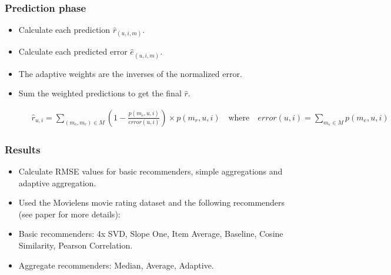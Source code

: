 \documentclass[screen]{beamer}
\begin{document}
\begin{frame}
  \frametitle{Prediction phase}
  
  \begin{itemize}
    \item Calculate each prediction $\hat{r}_{(u,i,m)}$.
    \item Calculate each predicted error $\hat{e}_{(u,i,m)}$.
    \item The adaptive weights are the inverses of the normalized error.
    \item Sum the weighted predictions to get the final $\hat{r}$.
  \end{itemize}
  
  \begin{figure}[!t]
  \tiny
  \begin{eqnarray}
    \label{eq:adaptive}
    \hat{r}_{u,i} = \sum_{(m_{e}, m_{r}) \in M} (1 - 
    \frac{
      p(m_{e},u,i)
    }{
      error(u,i)
    }) \times p(m_{r},u,i)
    \quad
    \text{where}
    \quad
    error(u,i) = \sum_{m_e \in M} p(m_e,u,i) 
  \end{eqnarray}
  \end{figure}
\end{frame}

\begin{frame}
  \frametitle{Results}
  \begin{itemize}
    \item Calculate RMSE values for basic recommenders, simple aggregations and adaptive aggregation.
    \item Used the Movielens movie rating dataset and the following recommenders (see paper for more details):
    \item Basic recommenders: 4x SVD, Slope One, Item Average, Baseline, Cosine Similarity, Pearson Correlation.
    \item Aggregate recommenders: Median, Average, Adaptive.
  \end{itemize}
\end{frame}

\begin{frame}
  
\end{frame}

\begin{frame}
  
\end{frame}

\begin{frame}
  
\end{frame}
\end{document}
